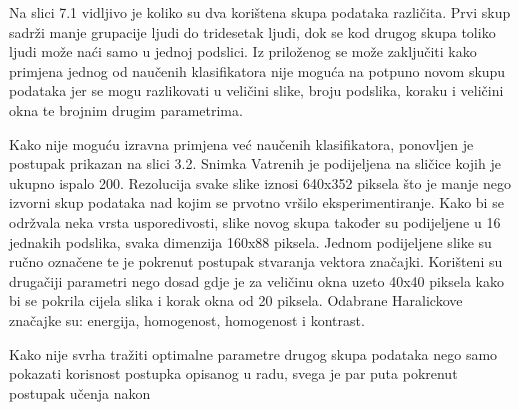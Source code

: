 \documentclass[times, utf8, zavrsni, numeric]{fer}
\begin{document}
\bigbreak

Na slici 7.1 vidljivo je koliko su dva korištena skupa podataka različita. Prvi skup sadrži
manje grupacije ljudi do tridesetak ljudi, dok se kod drugog skupa toliko ljudi može naći
samo u jednoj podslici. Iz priloženog se može zaključiti kako primjena jednog od naučenih klasifikatora
nije moguća na potpuno novom skupu podataka jer se mogu razlikovati u veličini slike, 
broju podslika, koraku i veličini okna te brojnim drugim parametrima. 

\bigbreak 

Kako nije moguću izravna primjena već naučenih klasifikatora, ponovljen je postupak 
prikazan na slici 3.2. Snimka Vatrenih je podijeljena na sličice kojih je ukupno ispalo 200. 
Rezolucija svake slike iznosi 640x352 piksela što je manje nego izvorni skup podataka 
nad kojim se prvotno vršilo eksperimentiranje. Kako bi se održvala neka vrsta usporedivosti,
 slike novog skupa također su podijeljene u 16 jednakih podslika, svaka dimenzija 160x88 piksela. 
Jednom podijeljene slike su ručno označene te je pokrenut postupak
stvaranja vektora značajki. Korišteni su drugačiji parametri nego dosad gdje je za
veličinu okna uzeto 40x40 piksela kako bi se pokrila cijela slika i korak okna od 20 piksela.
Odabrane Haralickove značajke su: energija, homogenost, homogenost i kontrast.

\bigbreak

Kako nije svrha tražiti optimalne parametre drugog skupa podataka nego samo pokazati 
korisnost postupka opisanog u radu, svega je par puta pokrenut postupak učenja nakon 
\end{document}
